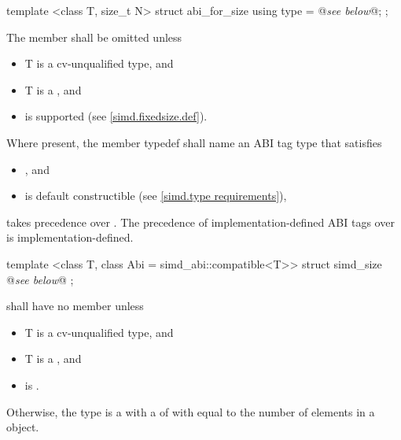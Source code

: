 \begin{itemdecl}
template <class T, size_t N> struct abi_for_size { using type = @\emph{see below}@; };
\end{itemdecl}
\begin{itemdescr}
  \pnum The member  shall be omitted unless
  \begin{itemize}
    \item \type T is a cv-unqualified type, and
    \item \type T is a \realArithmeticType{}, and
    \item \fixedsizeN is supported (see \ref{simd.fixedsize.def}).
  \end{itemize}

  \pnum Where present, the member typedef  shall name an ABI tag type that satisfies
  \begin{itemize}
    \item {}, and
    \item \simd[<T, type>] is default constructible (see \ref{simd.type requirements}),
  \end{itemize}
   takes precedence over \fixedsize{}.
  The precedence of implementation-defined ABI tags over \fixedsizeN is implementation-defined.
\end{itemdescr}

\begin{itemdecl}
template <class T, class Abi = simd_abi::compatible<T>> struct simd_size { @\emph{see below}@ };
\end{itemdecl}
\begin{itemdescr}
  \pnum\label{simd_size}%
   shall have no member  unless
  \begin{itemize}
    \item \type T is a cv-unqualified type, and
    \item \type T is a \realArithmeticType, and
    \item {} is \true.
  \end{itemize}

  \pnum
  Otherwise, the type  is a \BinaryTypeTrait with a \BaseCharacteristic of  with  equal to the number of elements in a \simd[<T, Abi>] object.

\end{itemdescr}

